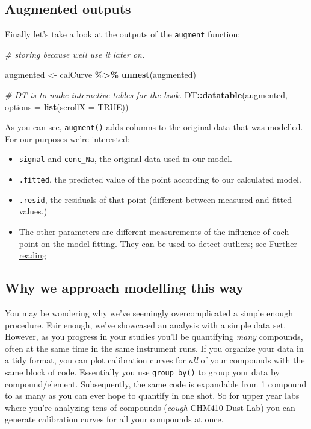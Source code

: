 \documentclass[
]{book}
\newenvironment{Shaded}{\begin{snugshade}}{\end{snugshade}}
\newcommand{\AttributeTok}[1]{\textcolor[rgb]{0.13,0.29,0.53}{#1}}
\newcommand{\CommentTok}[1]{\textcolor[rgb]{0.56,0.35,0.01}{\textit{#1}}}
\newcommand{\ConstantTok}[1]{\textcolor[rgb]{0.56,0.35,0.01}{#1}}
\newcommand{\FunctionTok}[1]{\textcolor[rgb]{0.13,0.29,0.53}{\textbf{#1}}}
\newcommand{\NormalTok}[1]{#1}
\newcommand{\OtherTok}[1]{\textcolor[rgb]{0.56,0.35,0.01}{#1}}
\newcommand{\SpecialCharTok}[1]{\textcolor[rgb]{0.81,0.36,0.00}{\textbf{#1}}}
\providecommand{\tightlist}{%
  \setlength{\itemsep}{0pt}\setlength{\parskip}{0pt}}
\begin{document}
\hypertarget{augmented-outputs}{%
\subsection{Augmented outputs}\label{augmented-outputs}}

Finally let's take a look at the outputs of the \texttt{augment} function:

\begin{Shaded}
\begin{Highlighting}[]
\CommentTok{\# storing because we\textquotesingle{}ll use it later on. }

\NormalTok{augmented }\OtherTok{\textless{}{-}}\NormalTok{ calCurve }\SpecialCharTok{\%\textgreater{}\%} 
  \FunctionTok{unnest}\NormalTok{(augmented)}

\CommentTok{\# DT is to make interactive tables for the book.}
\NormalTok{DT}\SpecialCharTok{::}\FunctionTok{datatable}\NormalTok{(augmented, }
              \AttributeTok{options =} \FunctionTok{list}\NormalTok{(}\AttributeTok{scrollX =} \ConstantTok{TRUE}\NormalTok{))}
\end{Highlighting}
\end{Shaded}

As you can see, \texttt{augment()} adds columns to the original data that was modelled. For our purposes we're interested:

\begin{itemize}
\tightlist
\item
  \texttt{signal} and \texttt{conc\_Na}, the original data used in our model.
\item
  \texttt{.fitted}, the predicted value of the point according to our calculated model.
\item
  \texttt{.resid}, the residuals of that point (different between measured and fitted values.)
\item
  The other parameters are different measurements of the influence of each point on the model fitting. They can be used to detect outliers; see \protect\hyperlink{further-reading}{Further reading}
\end{itemize}

\hypertarget{why-we-approach-modelling-this-way}{%
\subsection{Why we approach modelling this way}\label{why-we-approach-modelling-this-way}}

You may be wondering why we've seemingly overcomplicated a simple enough procedure. Fair enough, we've showcased an analysis with a simple data set. However, as you progress in your studies you'll be quantifying \emph{many} compounds, often at the same time in the same instrument runs. If you organize your data in a tidy format, you can plot calibration curves for \emph{all} of your compounds with the same block of code. Essentially you use \texttt{group\_by()} to group your data by compound/element. Subsequently, the same code is expandable from 1 compound to as many as you can ever hope to quantify in one shot. So for upper year labs where you're analyzing tens of compounds (\emph{cough} CHM410 Dust Lab) you can generate calibration curves for all your compounds at once.
\end{document}
